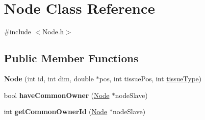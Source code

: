 \hypertarget{classNode}{}\section{Node Class Reference}
\label{classNode}


{\ttfamily \#include $<$Node.\+h$>$}

\subsection*{Public Member Functions}
\begin{DoxyCompactItemize}
\item 
\hypertarget{classNode_ac84926c5a9cf2883665f00382781b932}{}{\bfseries Node} (int id, int dim, double $\ast$pos, int tissue\+Pos, int \hyperlink{classNode_ae621097f98f1d33d283cf65a0a02d29a}{tissue\+Type})\label{classNode_ac84926c5a9cf2883665f00382781b932}

\item 
\hypertarget{classNode_ab165125d2f0e60b9030468a4152c3ccb}{}bool {\bfseries have\+Common\+Owner} (\hyperlink{classNode}{Node} $\ast$node\+Slave)\label{classNode_ab165125d2f0e60b9030468a4152c3ccb}

\item 
\hypertarget{classNode_a52d23c3e39f6de623ed0aad9bc225c14}{}int {\bfseries get\+Common\+Owner\+Id} (\hyperlink{classNode}{Node} $\ast$node\+Slave)\label{classNode_a52d23c3e39f6de623ed0aad9bc225c14}


\end{DoxyCompactItemize}
